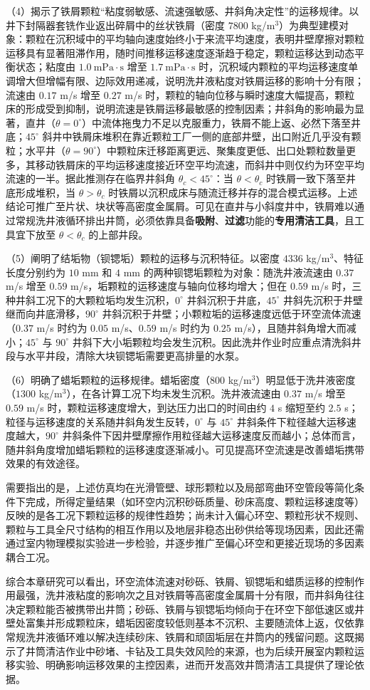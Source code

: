 （4）揭示了铁屑颗粒“粘度弱敏感、流速强敏感、井斜角决定性”的运移规律。以井下封隔器套铣作业返出碎屑中的丝状铁屑（密度 $7800$ kg/m$^{3}$）为典型建模对象：颗粒在沉积域中的平均轴向速度始终小于来流平均速度，表明井壁摩擦对颗粒运移具有显著阻滞作用，随时间推移运移速度逐渐趋于稳定，颗粒运移达到动态平衡状态；粘度由 $1.0\ \mathrm{mPa}\cdot\mathrm{s}$ 增至 $1.7\ \mathrm{mPa}\cdot\mathrm{s}$ 时，沉积域内颗粒的平均运移速度单调增大但增幅有限、边际效用递减，说明洗井液粘度对铁屑运移的影响十分有限；流速由 $0.17$ m/s 增至 $0.27$ m/s 时，颗粒的轴向位移与瞬时速度大幅提高，颗粒床的形成受到抑制，说明流速是铁屑运移最敏感的控制因素；井斜角的影响最为显著，直井（$\theta=0^\circ$）中流体拖曳力不足以克服重力，铁屑不能上返、必然下落至井底；$45^\circ$ 斜井中铁屑床堆积在靠近颗粒工厂一侧的底部井壁，出口附近几乎没有颗粒；水平井（$\theta=90^\circ$）中颗粒床迁移距离更远、聚集度更低、出口处颗粒数量更多，其移动铁屑床的平均运移速度接近环空平均流速，而斜井中则仅约为环空平均流速的一半。据此推测存在临界井斜角 $\theta_c<45^\circ$：当 $\theta<\theta_c$ 时铁屑一致下落至井底形成堆积，当 $\theta>\theta_c$ 时铁屑以沉积成床与随流迁移并存的混合模式运移。上述结论可推广至片状、块状等高密度金属屑。可见在直井与小斜度井中，铁屑难以通过常规洗井液循环排出井筒，必须依靠具备\textbf{吸附}、\textbf{过滤}功能的\textbf{专用清洁工具}，且工具宜下放至 $\theta<\theta_c$ 的上部井段。

（5）阐明了结垢物（钡锶垢）颗粒的运移与沉积特征。以密度 $4336$ kg/m$^{3}$、特征长度分别约为 $10$ mm 和 $4$ mm 的两种钡锶垢颗粒为对象：随洗井液流速由 $0.37$ m/s 增至 $0.59$ m/s，垢颗粒的运移速度与轴向位移均增大；但在 $0.59$ m/s 时，三种井斜工况下的大颗粒垢均发生沉积，$0^\circ$ 井斜沉积于井底，$45^\circ$ 井斜先沉积于井壁继而向井底滑移，$90^\circ$ 井斜沉积于井壁；小颗粒垢的运移速度远低于环空流体流速（$0.37$ m/s 时约为 $0.05$ m/s、$0.59$ m/s 时约为 $0.25$ m/s），且随井斜角增大而减小；$45^\circ$ 与 $90^\circ$ 井斜下大小垢颗粒均会发生沉积。因此洗井作业时应重点清洗斜井段与水平井段，清除大块钡锶垢需要更高排量的水泵。

（6）明确了蜡垢颗粒的运移规律。蜡垢密度（$800$ kg/m$^{3}$）明显低于洗井液密度（$1300$ kg/m$^{3}$），在各计算工况下均未发生沉积。洗井液流速由 $0.37$ m/s 增至 $0.59$ m/s 时，颗粒运移速度增大，到达压力出口的时间由约 $4$ s 缩短至约 $2.5$ s；粒径与运移速度的关系随井斜角发生反转，$0^\circ$ 与 $45^\circ$ 井斜条件下粒径越大运移速度越大，$90^\circ$ 井斜条件下因井壁摩擦作用粒径越大运移速度反而越小；总体而言，随井斜角度增加蜡垢颗粒的运移速度逐渐减小。可见提高环空流速是改善蜡垢携带效果的有效途径。

需要指出的是，上述仿真均在光滑管壁、球形颗粒以及局部弯曲环空管段等简化条件下完成，所得定量结果（如环空内沉积砂砾质量、砂床高度、颗粒运移速度等）反映的是各工况下颗粒运移的规律性趋势；尚未计入偏心环空、颗粒形状不规则、颗粒与工具全尺寸结构的相互作用以及地层非稳态出砂供给等现场因素，因此还需通过室内物理模拟实验进一步检验，并逐步推广至偏心环空和更接近现场的多因素耦合工况。

综合本章研究可以看出，环空流体流速对砂砾、铁屑、钡锶垢和蜡质运移的控制作用最强，洗井液粘度的影响次之且对铁屑等高密度金属屑十分有限，而井斜角往往决定颗粒能否被携带出井筒；砂砾、铁屑与钡锶垢均倾向于在环空下部低速区或井壁处富集并形成颗粒床，蜡垢因密度较低则基本不沉积、主要随流体上返，仅依靠常规洗井液循环难以解决连续砂床、铁屑和顽固垢层在井筒内的残留问题。这既揭示了井筒清洁作业中砂堵、卡钻及工具失效风险的来源，也为后续开展室内颗粒运移实验、明确影响运移效果的主控因素，进而开发高效井筒清洁工具提供了理论依据。
